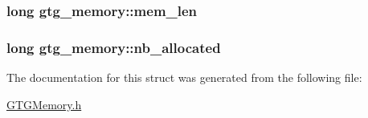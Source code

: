\hypertarget{structgtg__memory_a6cd255b42292aec9dcd63cc8acba7798}{
\subsubsection[{mem\-\_\-len}]{\setlength{\rightskip}{0pt plus 5cm}long gtg\-\_\-memory\-::mem\-\_\-len}}\label{structgtg__memory_a6cd255b42292aec9dcd63cc8acba7798}
\hypertarget{structgtg__memory_a0e8dbe52c899485e23a29fca18203a4f}{
\subsubsection[{nb\-\_\-allocated}]{\setlength{\rightskip}{0pt plus 5cm}long gtg\-\_\-memory\-::nb\-\_\-allocated}}\label{structgtg__memory_a0e8dbe52c899485e23a29fca18203a4f}


The documentation for this struct was generated from the following file\-:\begin{DoxyCompactItemize}
\item 
\hyperlink{GTGMemory_8h}{G\-T\-G\-Memory.\-h}\end{DoxyCompactItemize}
